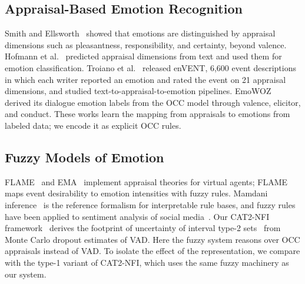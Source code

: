 \documentclass[conference, a4paper]{IEEEtran}
\begin{document}
\subsection{Appraisal-Based Emotion Recognition}
Smith and Ellsworth~\cite{smith1985patterns} showed that emotions are distinguished by appraisal dimensions such as pleasantness, responsibility, and certainty, beyond valence. Hofmann et al.~\cite{hofmann2020appraisal} predicted appraisal dimensions from text and used them for emotion classification. Troiano et al.~\cite{troiano2023dimensional} released enVENT, 6,600 event descriptions in which each writer reported an emotion and rated the event on 21 appraisal dimensions, and studied text-to-appraisal-to-emotion pipelines. EmoWOZ~\cite{feng2022emowoz} derived its dialogue emotion labels from the OCC model through valence, elicitor, and conduct. These works learn the mapping from appraisals to emotions from labeled data; we encode it as explicit OCC rules.

\subsection{Fuzzy Models of Emotion}
FLAME~\cite{elnasr2000flame} and EMA~\cite{gratch2004domain} implement appraisal theories for virtual agents; FLAME maps event desirability to emotion intensities with fuzzy rules. Mamdani inference~\cite{mamdani1975experiment} is the reference formalism for interpretable rule bases, and fuzzy rules have been applied to sentiment analysis of social media~\cite{vashishtha2019fuzzy}. Our CAT2-NFI framework~\cite{bensaid_cat2nfi} derives the footprint of uncertainty of interval type-2 sets~\cite{mendel2017uncertain} from Monte Carlo dropout estimates of VAD. Here the fuzzy system reasons over OCC appraisals instead of VAD. To isolate the effect of the representation, we compare with the type-1 variant of CAT2-NFI, which uses the same fuzzy machinery as our system.
\end{document}

